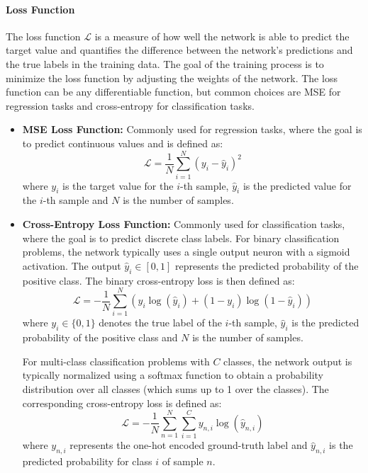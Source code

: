 \paragraph{Loss Function}
The loss function $\mathcal{L}$ is a measure of how well the network is able to predict the target value and quantifies the difference between the network's predictions and the true labels in the training data. The goal of the training process is to minimize the loss function by adjusting the weights of the network. The loss function can be any differentiable function, but common choices are \acf{MSE} for regression tasks and cross-entropy for classification tasks.
\begin{itemize}
	\item \textbf{\acf{MSE} Loss Function:} Commonly used for regression tasks, where the goal is to predict continuous values and is defined as:
	\begin{equation}
		\mathcal{L} = \frac{1}{N} \sum_{i=1}^{N} (y_i - \hat{y}_i)^2
	\end{equation}
	where $y_i$ is the target value for the $i$-th sample, $\hat{y}_i$ is the predicted value for the $i$-th sample and $N$ is the number of samples.
	

	\item \textbf{Cross-Entropy Loss Function:} Commonly used for classification tasks, where the goal is to predict discrete class labels. 
	For binary classification problems, the network typically uses a single output neuron with a sigmoid activation. The output $\hat{y}_i \in [0,1]$ represents the predicted probability of the positive class. The binary cross-entropy loss is then defined as:
		\begin{equation}
			\mathcal{L} =
			-\frac{1}{N}\sum_{i=1}^{N}
			\left(
			y_i \log(\hat{y}_i) + (1 - y_i)\log(1 - \hat{y}_i)
			\right)
		\end{equation}
		where $y_i \in \{0,1\}$ denotes the true label of the $i$-th sample, $\hat{y}_i$ is the predicted probability of the positive class and $N$ is the number of samples.

		For multi-class classification problems with $C$ classes, the network output is typically normalized using a softmax function to obtain a probability distribution over all classes (which sums up to 1 over the classes). The corresponding cross-entropy loss is defined as:
		\begin{equation}
			\mathcal{L} =
			-\frac{1}{N}\sum_{n=1}^{N}\sum_{i=1}^{C}
			y_{n,i}\log(\hat{y}_{n,i})
		\end{equation}
		where $y_{n,i}$ represents the one-hot encoded ground-truth label and $\hat{y}_{n,i}$ is the predicted probability for class $i$ of sample $n$.

\end{itemize}
















